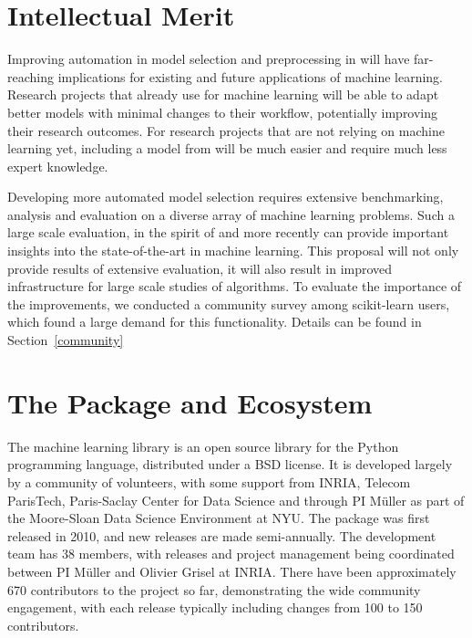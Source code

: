 \section{Intellectual Merit}
Improving automation in model selection and preprocessing in \sklearn{} will have far-reaching
implications for existing and future applications of machine learning.
Research projects that already use \sklearn{} for machine learning will be able to adapt better
models with minimal changes to their workflow, potentially improving their research outcomes.
For research projects that are not relying on machine learning yet, including a model
from \sklearn{} will be much easier and require much less expert knowledge.

Developing more automated model selection requires extensive benchmarking,
analysis and evaluation on a diverse array of machine learning problems. Such a
large scale evaluation, in the spirit of \textcite{caruana2008empirical,
caruana2006empirical} and more recently \textcite{feurer-nips2015} can provide
important insights into the state-of-the-art in machine learning. This proposal
will not only provide results of extensive evaluation, it will also result in
improved infrastructure for large scale studies of algorithms.
To evaluate the importance of the improvements, we conducted a community survey
among scikit-learn users, which found a large demand for this functionality.
Details can be found in Section~\ref{community}

\section{The \sklearn{} Package and Ecosystem}
The \sklearn{} machine learning library is an open source library for the
Python programming language, distributed under a BSD license.
It is developed largely by a community of volunteers, with some support from
INRIA, Telecom ParisTech, Paris-Saclay Center for Data Science and through PI
M\"uller as part of the Moore-Sloan Data Science Environment at NYU\@.
The package was first released in 2010, and new releases are made semi-annually.
The development team has 38 members, with releases and project management being
coordinated between PI M\"uller and Olivier Grisel at INRIA\@.
There have been approximately 670 contributors to the project so far, demonstrating
the wide community engagement, with each release typically including changes
from 100 to 150 contributors.

